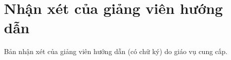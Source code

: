 \chapter*{Nhận xét của giảng viên hướng dẫn}
\label{advisor}

Bản nhận xét của giảng viên hướng dẫn (có chữ ký) do giáo vụ cung cấp.
